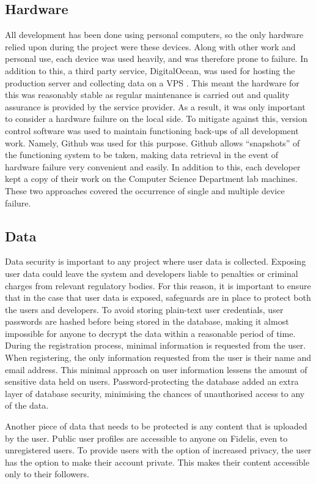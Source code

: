 \subsection{Hardware}
All development has been done using personal computers, so the only hardware relied upon during the project were these devices. Along with other work and personal use, each device was used heavily, and was therefore prone to failure. In addition to this, a third party service, DigitalOcean, was used for hosting the production server and collecting data on a VPS \cite{DigitalOcean:Home}. This meant the hardware for this was reasonably stable as regular maintenance is carried out and quality assurance is provided by the service provider. As a result, it was only important to consider a hardware failure on the local side. To mitigate against this, version control software was used to maintain functioning back-ups of all development work. Namely, Github was used for this purpose. Github allows ``snapshots'' of the functioning system to be taken, making data retrieval in the event of hardware failure very convenient and easily. In addition to this, each developer kept a copy of their work on the Computer Science Department lab machines. These two approaches covered the occurrence of single and multiple device failure.

\subsection{Data}
Data security is important to any project where user data is collected. Exposing user data could leave the system and developers liable to penalties or criminal charges from relevant regulatory bodies. For this reason, it is important to ensure that in the case that user data is exposed, safeguards are in place to protect both the users and developers. To avoid storing plain-text user credentials, user passwords are hashed before being stored in the database, making it almost impossible for anyone to decrypt the data within a reasonable period of time. During the registration process, minimal information is requested from the user. When registering, the only information requested from the user is their name and email address. This minimal approach on user information lessens the amount of sensitive data held on users. Password-protecting the database added an extra layer of database security, minimising the chances of unauthorised access to any of the data.

Another piece of data that needs to be protected is any content that is uploaded by the user. Public user profiles are accessible to anyone on Fidelis, even to unregistered users. To provide users with the option of increased privacy, the user has the option to make their account private. This makes their content accessible only to their followers.

